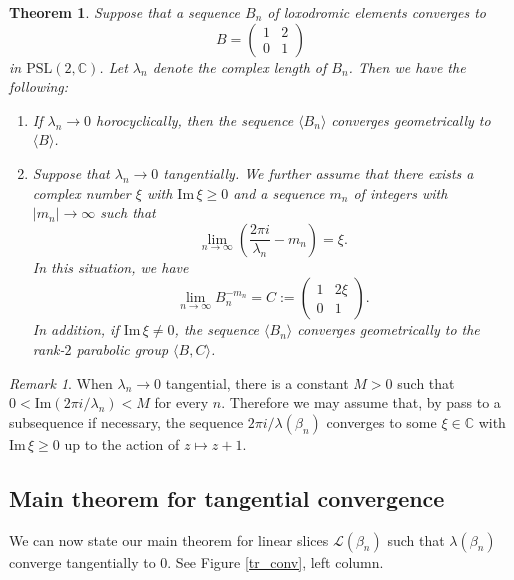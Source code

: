 \documentclass[12pt]{article}
\theoremstyle{plain}
\newtheorem{thm}{Theorem}[section]
\theoremstyle{definition}
\theoremstyle{remark}
\newtheorem*{rem}{Remark}
\newcommand{\C}{\mathbb C}
\newcommand{\LL}{\mathcal L}
\newcommand{\lam}{\lambda}
\newcommand{\fty}{\infty}
\newcommand{\la}{\langle}
\newcommand{\ra}{\rangle}
\newcommand{\im}{\mathrm{Im}}
\newcommand{\psl}{{\mathrm{PSL}}(2,\mathbb C)}
\begin{document}
\begin{thm}\label{cyclic}
Suppose that a sequence  $B_n$  of 
loxodromic elements converges to 
$$
B=\left(\begin{array}{cc}1 & 2 \\0 & 1\end{array}\right)
$$
in $\psl$. Let $\lam_n$ denote the complex length of $B_n$. 
 Then we have the following: 
\begin{enumerate}
\item 
If  $\lam_n \to 0$ horocyclically, then the sequence $\la B_n \ra$ converges geometrically to $\la B \ra$.  

\item  Suppose that $\lam_n \to 0$ tangentially.  
We further assume  that 
there exists a complex number $\xi$  with $\im\,\xi \ge 0$ 
and a sequence $m_n$ of integers  with $|m_n| \to \fty$ 
such that 
\begin{equation*}
\lim_{n \to \fty} \left(\frac{2\pi i}{\lam_n} -m_n \right)=\xi. 
\end{equation*}
In this situation, we have 
$$
\lim_{n \to \fty}B_n^{-m_n}=C:=\left(\begin{array}{cc}1 & 2\xi \\0 & 1\end{array}\right). 
$$
In addition, if  $\im\,\xi \ne 0$,  
the sequence $\la B_n \ra$ converges  geometrically to the 
rank-$2$ parabolic group $\la B, C \ra$. 
\end{enumerate}
\end{thm}

\begin{rem}
When $\lam_n \to 0$ tangential,  there is a constant $M>0$ such that 
$0<\im(2\pi i/\lam_n)<M$ for every $n$.   
Therefore we may assume that, 
by pass to a subsequence if necessary,  the sequence  
$2\pi i/\lam(\beta_n)$ converges to some $\xi \in \C$ with $\im\,\xi \ge 0$  up to the action of $z \mapsto z+1$.  
\end{rem}



\subsection{Main theorem for tangential convergence}

We can now state our main theorem for linear slices $\LL(\beta_n)$ 
such that  $\lam(\beta_n)$ converge tangentially to $0$. 
See Figure \ref{tr_conv}, left column. 
\end{document}
